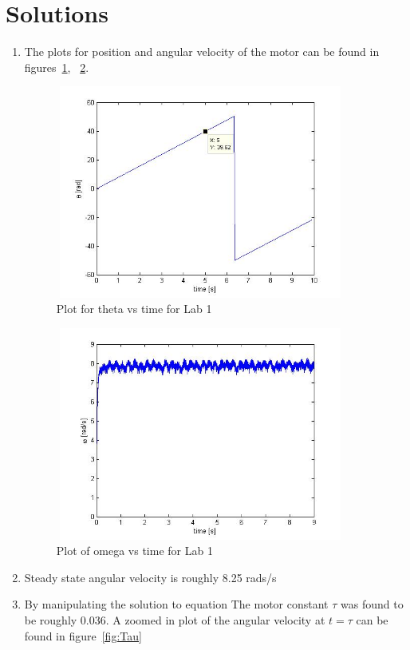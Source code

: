 \documentclass[letterpaper, 11pt, openany]{book}
\begin{document}
\section{Solutions}
\begin{enumerate}
\item 
The plots for position and angular velocity of the motor can be found in figures~\ref{fig:Theta},
~\ref{fig:Omega}. 
\begin{figure}[htbp]
\centering
\includegraphics[width=0.9\textwidth, height = 7cm]{graphics/Theta_Lab1.jpg} 
\caption{Plot for theta vs time for Lab 1}\label{fig:Theta}
\end{figure}

\begin{figure}[htbp]
\centering
\includegraphics[width=0.9\textwidth, height = 7cm]{graphics/Omega_Lab1.jpg} 
\caption{Plot of omega vs time for Lab 1}\label{fig:Omega}
\end{figure}


\item Steady state angular velocity is roughly 8.25 rads/s

\item By manipulating the solution to equation %
The motor constant $\tau$ was found to be roughly 0.036. A 
zoomed in plot of the angular velocity at $t = \tau$ can be found in
figure~\ref{fig:Tau}


\end{enumerate}
\end{document}

